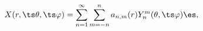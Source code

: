 \begin{equation}
X(r,\ts \theta,\ts \varphi) = \sum_{n=1}^\infty \sum_{m=-n}^n 
a_{n, m} (r) Y^m _n (\theta,\ts \varphi) \es, 
\end{equation}

